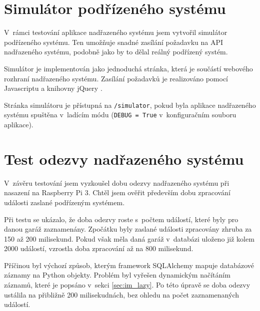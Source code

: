 \section{Simulátor podřízeného systému}

V~rámci testování aplikace nadřazeného systému jsem vytvořil simulátor podřízeného systému. Ten umožňuje snadné zasílání požadavku na API nadřazeného systému, podobně jako by to dělal reálný podřízený systém.

Simulátor je implementován jako jednoduchá stránka, která je součástí webového rozhraní nadřazeného systému. Zasílání požadavků je realizováno pomocí Javascriptu a knihovny jQuery \cite{jquery_about}. 

Stránka simulátoru je přístupná na \texttt{/simulator}, pokud byla aplikace nadřazeného systému spuštěna v~ladícím módu (\texttt{DEBUG = True} v~konfiguračním souboru aplikace).

\section{Test odezvy nadřazeného systému}
\label{sec:te_lat}

V~závěru testování jsem vyzkoušel dobu odezvy nadřazeného systému při nasazení na Raspberry Pi 3. Chtěl jsem ověřit především dobu zpracování události zaslané podřízeným systémem.

Při testu se ukázalo, že doba odezvy roste s~počtem událostí, které byly pro danou garáž zaznamenány. Zpočátku byly zaslané události zpracovány zhruba za 150 až 200 milisekund. Pokud však měla daná garáž v~databázi uloženo již kolem 2000 událostí, vzrostla doba zpracování až na 800 milisekund.

Příčinou byl výchozí způsob, kterým framework SQLAlchemy mapuje databázové záznamy na Python objekty. Problém byl vyřešen dynamickým načítáním záznamů, které je popsáno v~sekci \ref{sec:im_lazy}. Po této úpravě se doba odezvy ustálila na přibližně 200 milisekudnách, bez ohledu na počet zaznamenaných událostí.



